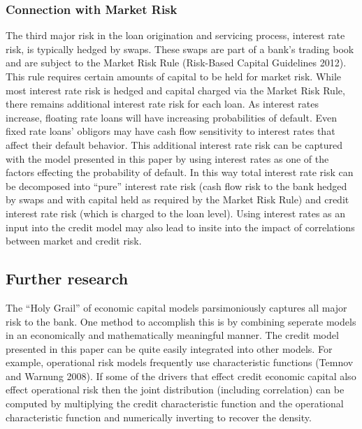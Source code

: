 \documentclass[12pt]{article}
\theoremstyle{definition}
\begin{document}
\subsubsection{Connection with Market Risk}
The third major risk in the loan origination and servicing process, interest rate risk, is typically hedged by swaps.  These swaps are part of a bank's trading book and are subject to the Market Risk Rule (Risk-Based Capital Guidelines 2012).  This rule requires certain amounts of capital to be held for market risk.  While most interest rate risk is hedged and capital charged via the Market Risk Rule, there remains additional interest rate risk for each loan.  As interest rates increase, floating rate loans will have increasing probabilities of default.  Even fixed rate loans' obligors may have cash flow sensitivity to interest rates that affect their default behavior.  This additional interest rate risk can be captured with the model presented in this paper by using interest rates as one of the factors effecting the probability of default.  In this way total interest rate risk can be decomposed into ``pure'' interest rate risk (cash flow risk to the bank hedged by swaps and with capital held as required by the Market Risk Rule) and credit interest rate risk (which is charged to the loan level).   Using interest rates as an input into the credit model may also lead to insite into the impact of correlations between market and credit risk.

\subsection{Further research}
The ``Holy Grail'' of economic capital models parsimoniously captures all major risk to the bank.  One method to accomplish this is by combining seperate models in an economically and mathematically meaningful manner.  The credit model presented in this paper can be quite easily integrated into other models.  For example, operational risk models frequently use characteristic functions (Temnov and Warnung 2008).  If some of the drivers that effect credit economic capital also effect operational risk then the joint distribution (including correlation) can be computed by multiplying the credit characteristic function and the operational characteristic function and numerically inverting to recover the density.  
\end{document}
